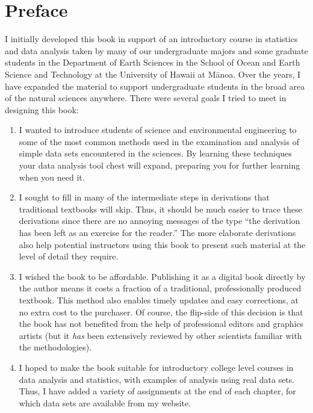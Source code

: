 %
\chapter*{Preface}

I initially developed this book in support of an introductory course in statistics
and data analysis taken by many of our undergraduate majors and some graduate students in the Department of
Earth Sciences in the School of Ocean and Earth Science and Technology at
the University of Hawaii at M\={a}noa.  Over the years, I have
expanded the material to support undergraduate students in the broad area of the natural sciences
anywhere.  There were several goals I tried to meet in designing this book:
\begin{enumerate}
\item I wanted to introduce students of science and environmental engineering to some
   of the most common methods used in the examination and analysis of simple data sets
   encountered in the sciences.  By learning these techniques your data analysis tool
   chest will expand, preparing you for further learning when you need it.
\item I sought to fill in many of the intermediate steps in derivations that traditional
   textbooks will skip.  Thus, it should be much easier to trace these derivations since there
   are no annoying messages of the type ``the derivation has been left as an exercise for the reader.''
   The more elaborate derivations also help potential instructors using this book to present such
   material at the level of detail they require.
\item I wished the book to be affordable.  Publishing it as a digital book directly by the author
   means it costs a fraction of a traditional, professionally produced textbook.  This method also enables timely updates
   and easy corrections, at no extra cost to the purchaser.  Of course, the flip-side of this decision
   is that the book has not benefited from the help of professional editors and graphics artists
   (but it \emph{has} been extensively reviewed by other scientists familiar with the methodologies).
\item I hoped to make the book suitable for introductory college level courses in data analysis and statistics, with
   examples of analysis using real data sets.  Thus, I have added a
   variety of assignments at the end of each chapter, for which data sets are available from my website.
\end{enumerate}


